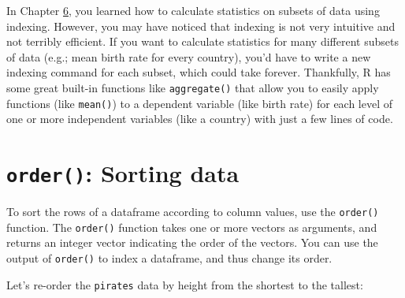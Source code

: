 \documentclass[]{book}
\newenvironment{Shaded}{\begin{snugshade}}{\end{snugshade}}
\newcommand{\KeywordTok}[1]{\textcolor[rgb]{0.13,0.29,0.53}{\textbf{{#1}}}}
\newcommand{\DataTypeTok}[1]{\textcolor[rgb]{0.13,0.29,0.53}{{#1}}}
\newcommand{\StringTok}[1]{\textcolor[rgb]{0.31,0.60,0.02}{{#1}}}
\newcommand{\CommentTok}[1]{\textcolor[rgb]{0.56,0.35,0.01}{\textit{{#1}}}}
\newcommand{\NormalTok}[1]{{#1}}
\theoremstyle{definition}
\theoremstyle{definition}
\theoremstyle{remark}
\begin{document}
\begin{Shaded}
\end{Shaded}

In Chapter \href{matricesdataframes}{6}, you learned how to calculate
statistics on subsets of data using indexing. However, you may have
noticed that indexing is not very intuitive and not terribly efficient.
If you want to calculate statistics for many different subsets of data
(e.g.; mean birth rate for every country), you'd have to write a new
indexing command for each subset, which could take forever. Thankfully,
R has some great built-in functions like \texttt{aggregate()} that allow
you to easily apply functions (like \texttt{mean()}) to a dependent
variable (like birth rate) for each level of one or more independent
variables (like a country) with just a few lines of code.

\section{\texorpdfstring{\texttt{order()}: Sorting
data}{order(): Sorting data}}\label{order-sorting-data}

To sort the rows of a dataframe according to column values, use the
\texttt{order()} function. The \texttt{order()} function takes one or
more vectors as arguments, and returns an integer vector indicating the
order of the vectors. You can use the output of \texttt{order()} to
index a dataframe, and thus change its order.

Let's re-order the \texttt{pirates} data by height from the shortest to
the tallest:
\end{document}
